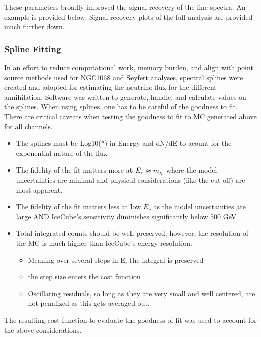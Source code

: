 These parameters broadly improved the signal recovery of the line spectra.
An example is provided below.
Signal recovery plots of the full analysis are provided much further down.

\subsubsection{Spline Fitting}\label{sec:icDM_splines}

In an effort to reduce computational work, memory burden, and align with point source methods used for NGC1068 and Seyfert analyses, spectral splines were created and adopted for estimating the neutrino flux for the different annihilation.
Software was written to generate, handle, and calculate values on the splines.
When using splines, one has to be careful of the goodness to fit.
There are critical caveats when testing the goodness to fit to MC generated above for all channels.
\begin{itemize}
    \item The splines must be Log10(*) in Energy and dN/dE to acount for the exponential nature of the flux
    \item The fidelity of the fit matters more at $ E_\nu \thickapprox m_\chi $ where the model uncertainties are minimal and physical considerations (like the cut-off) are most apparent.
    \item The fidelity of the fit matters less at low $ E_\nu $ as the model uncertainties are large AND IceCube's sensitivity diminishes significantly below 500 GeV
    \item Total integrated counts should be well preserved, however, the resolution of the MC is much higher than IceCube's energy resolution.
    \begin{itemize}
        \item Meaning over several steps in E, the integral is preserved
        \item the step size enters the cost function
        \item Oscillating residuals, so long as they are very small and well centered, are not penalized as this gets averaged out.
    \end{itemize}
\end{itemize}

The resulting cost function to evaluate the goodness of fit was used to account for the above considerations.
\erriSpline

